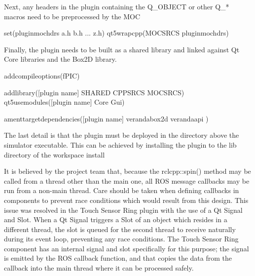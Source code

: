 \documentclass[letterpaper,10pt,english]{sphinxmanual}
\begin{document}
Next, any headers in the plugin containing the Q\_OBJECT or other Q\_* macros need to be preprocessed by the MOC

%
\begin{sphinxVerbatim}[commandchars=\\\{\}]
set(plugin\PYGZus{}moc\PYGZus{}hdrs a.h b.h ... z.h)
qt5\PYGZus{}wrap\PYGZus{}cpp(MOC\PYGZus{}SRCS \PYGZdl{}\PYGZob{}plugin\PYGZus{}moc\PYGZus{}hdrs\PYGZcb{})
\end{sphinxVerbatim}

Finally, the plugin needs to be built as a shared library and linked against Qt Core libraries and the Box2D library.

%
\begin{sphinxVerbatim}[commandchars=\\\{\}]
add\PYGZus{}compile\PYGZus{}options(\PYGZhy{}fPIC)

add\PYGZus{}library([plugin name] SHARED \PYGZdl{}\PYGZob{}CPP\PYGZus{}SRCS\PYGZcb{} \PYGZdl{}\PYGZob{}MOC\PYGZus{}SRCS\PYGZcb{})
qt5\PYGZus{}use\PYGZus{}modules([plugin name] Core Gui)

ament\PYGZus{}target\PYGZus{}dependencies([plugin name]
\PYGZdq{}veranda\PYGZus{}box2d\PYGZdq{}
\PYGZdq{}veranda\PYGZus{}api\PYGZdq{}
)
\end{sphinxVerbatim}

The last detail is that the plugin must be deployed in the directory above the simulator executable. This can be achieved by installing the plugin to
the lib directory of the workspace install

%
\begin{sphinxVerbatim}[commandchars=\\\{\}]
         \PYG{p}{[} \PYG{p}{]}
         
\end{sphinxVerbatim}


It is believed by the project team that, because the rclcpp::spin() method may be called from a thread other than the main one, all ROS message callbacks may be run
from a non-main thread. Care should be taken when defining callbacks in components to prevent race conditions which would result from this design. This issue was
resolved in the Touch Sensor Ring plugin with the use of a Qt Signal and Slot. When a Qt Signal triggers a Slot of an object which resides in a different thread,
the slot is queued for the second thread to receive naturally during its event loop, preventing any race conditions. The Touch Sensor Ring component has an internal
signal and slot specifically for this purpose; the signal is emitted by the ROS callback function, and that copies the data from the callback into the main thread
where it can be processed safely.
\end{document}
